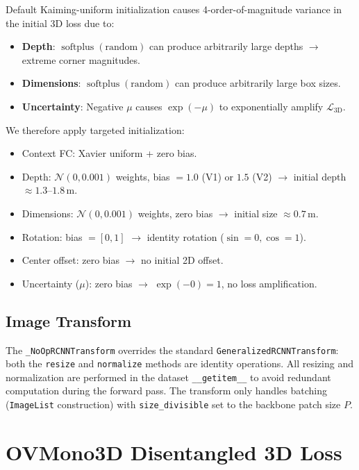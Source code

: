 \documentclass[runningheads]{llncs}
\newcommand{\op}[1]{\operatorname{#1}}
\begin{document}
Default Kaiming-uniform initialization causes 4-order-of-magnitude variance in the initial 3D loss due to:
\begin{itemize}
    \item \textbf{Depth}: $\op{softplus}(\text{random})$ can produce arbitrarily large depths $\to$ extreme corner magnitudes.
    \item \textbf{Dimensions}: $\op{softplus}(\text{random})$ can produce arbitrarily large box sizes.
    \item \textbf{Uncertainty}: Negative $\mu$ causes $\exp(-\mu)$ to exponentially amplify $\mathcal{L}_{\text{3D}}$.
\end{itemize}
We therefore apply targeted initialization:
\begin{itemize}
    \item Context FC: Xavier uniform + zero bias.
    \item Depth: $\mathcal{N}(0, 0.001)$ weights, bias $= 1.0$ (V1) or $1.5$ (V2) $\to$ initial depth $\approx 1.3$--$1.8$\,m.
    \item Dimensions: $\mathcal{N}(0, 0.001)$ weights, zero bias $\to$ initial size $\approx 0.7$\,m.
    \item Rotation: bias $= [0, 1]$ $\to$ identity rotation ($\sin=0, \cos=1$).
    \item Center offset: zero bias $\to$ no initial 2D offset.
    \item Uncertainty ($\mu$): zero bias $\to$ $\exp(-0) = 1$, no loss amplification.
\end{itemize}


\subsection{Image Transform}
\label{sec:transform}

The \texttt{\_NoOpRCNNTransform} overrides the standard \texttt{GeneralizedRCNNTransform}: both the \texttt{resize} and \texttt{normalize} methods are identity operations.  All resizing and normalization are performed in the dataset \texttt{\_\_getitem\_\_} to avoid redundant computation during the forward pass.  The transform only handles batching (\texttt{ImageList} construction) with \texttt{size\_divisible} set to the backbone patch size $P$.


\section{OVMono3D Disentangled 3D Loss}
\label{sec:loss_3d}
\end{document}
